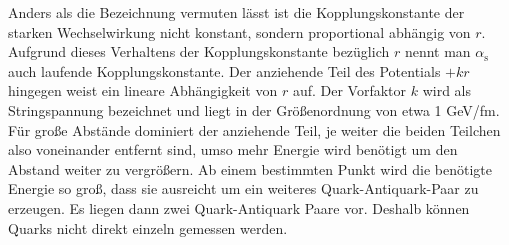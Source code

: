 Anders als die Bezeichnung vermuten l\"asst ist die Kopplungskonstante der starken Wechselwirkung nicht konstant, sondern proportional abh\"angig von $r$.
Aufgrund dieses Verhaltens der Kopplungskonstante bez\"uglich $r$ nennt man $\alpha_\text{s}$ auch laufende Kopplungskonstante.
\newline
Der anziehende Teil des Potentials $+kr$ hingegen weist ein lineare Abh\"angigkeit von $r$ auf.
Der Vorfaktor $k$ wird als Stringspannung bezeichnet und liegt in der Gr\"o{\ss}enordnung von etwa 1 GeV/fm.
F\"ur gro{\ss}e Abst\"ande dominiert der anziehende Teil, je weiter die beiden Teilchen also voneinander entfernt sind, umso mehr Energie wird ben\"otigt um den Abstand weiter zu vergr\"o{\ss}ern.
Ab einem bestimmten Punkt wird die ben\"otigte Energie so gro{\ss}, dass sie ausreicht um ein weiteres Quark-Antiquark-Paar zu erzeugen.
Es liegen dann zwei Quark-Antiquark Paare vor.
Deshalb k\"onnen Quarks nicht direkt einzeln gemessen werden.
\newline

